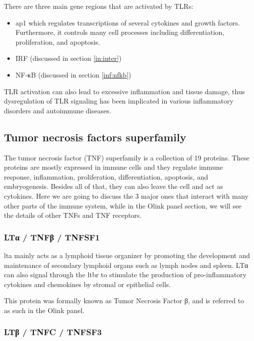 There are three main gene regions that are activated by TLRs:

\begin{itemize}
    \item \gls{ap1} which regulates transcriptions of several cytokines and growth factors. Furthermore, it controls many cell processes including differentiation, proliferation, and apoptosis.    
    \item IRF (discussed in section \ref{in:inter}) 
    \item NF-κB (discussed in section \ref{inf:nfkb})
\end{itemize}

TLR activation can also lead to excessive inflammation and tissue damage, thus dysregulation of TLR signaling has been implicated in various inflammatory disorders and autoimmune diseases.

\subsection{Tumor necrosis factors superfamily}
\label{in:tnf}

The tumor necrosis factor (TNF) superfamily is a collection of 19 proteins. These proteins are mostly expressed in immune cells and they regulate immune response, inflammation, proliferation, differentiation, apoptosis, and embryogenesis. Besides all of that, they can also leave the cell and act as cytokines. Here we are going to discuss the 3 major ones that interact with many other parts of the immune system, while in the Olink panel section, we will see the details of other TNFs and TNF receptors.


\subsubsection{LTα / TNFβ / TNFSF1}
\label{inf:tnfb}

\gls{lta} mainly acts as a lymphoid tissue organizer by promoting the development and maintenance of secondary lymphoid organs such as lymph nodes and spleen. LTα can also signal through the \gls{ltbr} to stimulate the production of pro-inflammatory cytokines and chemokines by stromal or epithelial cells.

This protein was formally known as Tumor Necrosis Factor β, and is referred to as such in the Olink panel.

\subsubsection{LTβ / TNFC / TNFSF3}

